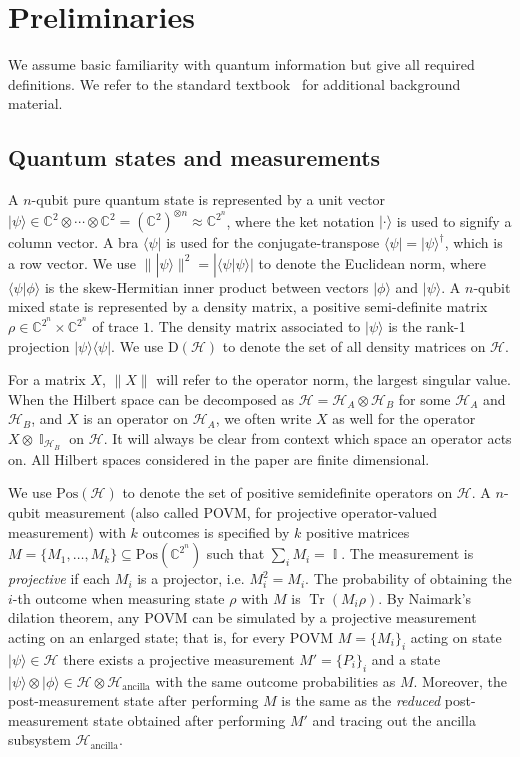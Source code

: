 \documentclass[11pt,letterpaper]{article}
\newcommand{\<}{\langle}
\renewcommand{\>}{\rangle}
\newcommand{\setft}[1]{\mathrm{#1}}
\newcommand{\Density}{\setft{D}}
\newcommand{\h}{\mathcal{H}}
\newcommand{\bra}[1]{\< #1 |}
\newcommand{\ket}[1]{| #1 \>}
\newcommand{\mH}{\mathcal{H}}
\DeclareMathOperator{\Id}{\mathbb{I}}
\DeclareMathOperator{\Tr}{Tr}
\newcommand{\C}{\mathbb{C}}
\newcommand{\Pos}{\setft{Pos}}
\begin{document}
\section{Preliminaries}
\label{sec:prelim}

We assume basic familiarity with quantum information but give all required definitions. We refer to the standard textbook~\cite{NieChu01} for additional background material. 

\subsection{Quantum states and measurements}

A $n$-qubit pure quantum state is represented by a unit vector
$\ket{\psi}\in \C^2 \otimes \cdots \otimes \C^2 = (\C^2)^{\otimes n}
\approx \C^{2^n}$,
where the ket notation $\ket{\cdot}$ is used to signify a column
vector. A bra $\bra{\psi}$ is used for the conjugate-transpose
$\bra{\psi} = \ket{\psi}^\dagger$, which is a row vector. We use
$\|\ket{\psi}\|^2 = |\bra{\psi}\psi\rangle|$ to denote the Euclidean
norm, where $\bra{\psi}\phi\rangle$ is the skew-Hermitian inner
product between vectors $\ket{\phi}$ and $\ket{\psi}$. A $n$-qubit
mixed state is represented by a density matrix, a positive
semi-definite matrix $\rho \in \C^{2^n} \times \C^{2^n}$ of trace
$1$. The density matrix associated to $\ket{\psi}$ is the rank-1
projection $\ket{\psi}\bra{\psi}$. We use $\Density(\mH)$ to denote the set of all density matrices on $\mH$. 

For a matrix $X$, $\|X\|$ will refer to the operator norm, the largest
singular value. When the Hilbert space can be decomposed as
$\h = \h_A \otimes \h_B$ for some $\h_A$ and $\h_B$, and $X$ is an
operator on $\h_A$, we often write $X$ as well for the operator
$X\otimes\Id_{\h_B}$ on $\h$. It will always be clear from context
which space an operator acts on. All Hilbert spaces considered in the paper are finite dimensional. 

We use $\Pos(\mH)$ to denote the set of positive semidefinite operators on $\mH$. 
A $n$-qubit measurement (also called POVM, for projective
operator-valued measurement) with $k$ outcomes is specified by $k$
positive matrices $M=\{M_1,\ldots,M_k\} \subseteq \Pos(\C^{2^n})$
such that $\sum_i M_i = \Id$. The measurement is \emph{projective} if
each $M_i$ is a projector, i.e. $M_i^2 = M_i$. The probability of
obtaining the $i$-th outcome when measuring state $\rho$ with $M$ is
$\Tr(M_i \rho)$. By Naimark's dilation theorem, any POVM can be
simulated by a projective measurement acting on an enlarged state;
that is, for every POVM $M = \{M_i\}_i$ acting on state
$\ket{\psi} \in \mathcal{H}$ there exists a projective measurement
$M' = \{P_i\}_i$ and a state
$\ket{\psi}\otimes \ket{\phi} \in \mathcal{H} \otimes
\mathcal{H}_{\text{ancilla}}$
with the same outcome probabilities as $M$. Moreover, the
post-measurement state after performing $M$ is the same as the
\emph{reduced} post-measurement state obtained after performing $M'$
and tracing out the ancilla subsystem $\mathcal{H}_{\text{ancilla}}$.
\end{document}
